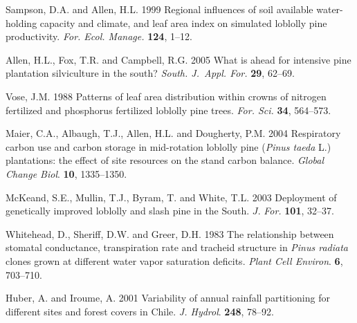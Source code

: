 \documentclass[final]{foresj}
\begin{document}
\begin{thebibliography}
Sampson, D.A. and Allen, H.L. 1999 Regional influences of
soil available water-holding capacity and climate, and leaf
area index on \hbox{simulated} loblolly pine productivity.
\textit{For. Ecol. Manage. }\textbf{124}, 1--12.


Allen, H.L., Fox, T.R. and Campbell, R.G. 2005 What is
ahead for intensive pine plantation silviculture in the
south? \textit{South. J.~Appl. For.} \textbf{29}, 62--69.


Vose, J.M. 1988 Patterns of leaf area distribution within
crowns of nitrogen fertilized and phosphorus fertilized
loblolly pine trees. \textit{For. Sci.} \textbf{34},
564--573.

Maier, C.A., Albaugh, T.J., Allen, H.L. and Dougherty, P.M.
2004 Respiratory carbon use and carbon storage in
mid-rotation loblolly pine (\textit{Pinus taeda} L.)
plantations: the effect of site resources on the stand
carbon balance. \textit{Global Change Biol}. \textbf{10},
1335--1350.

McKeand, S.E., Mullin, T.J., Byram, T. and White, T.L. 2003
Deployment of genetically improved loblolly and slash pine
in the South. $J$. \textit{For.} \textbf{101}, 32--37.

Whitehead, D., Sheriff, D.W. and Greer, D.H. 1983 The
relationship between stomatal conductance, transpiration
rate and tracheid structure in \textit{Pinus radiata}
clones grown at different water vapor saturation deficits.
\textit{Plant Cell Environ}. \textbf{6}, 703--710.

Huber, A. and Iroume, A. 2001 Variability of annual
rainfall partitioning for different sites and forest covers
in Chile. \textit{J. Hydrol}. \textbf{248}, 78--92.

\end{thebibliography}
\end{document}
